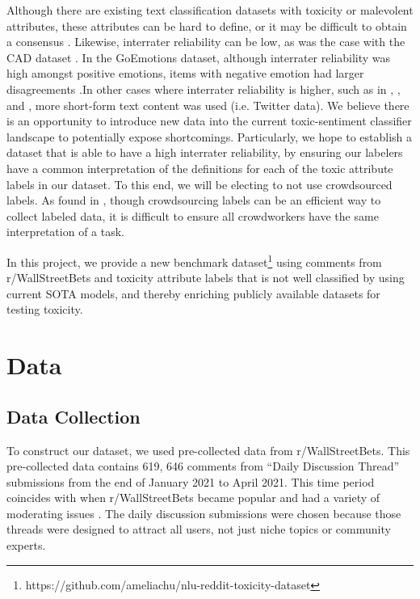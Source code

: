 \documentclass[11pt]{article}
\begin{document}
Although there are existing text classification datasets with toxicity or malevolent attributes, these attributes can be hard to define, or it may be difficult to obtain a consensus \citep{davidson2017, salminen2018, salminen2019}. Likewise, interrater reliability can be low, as was the case with the CAD dataset \citep{vidgen2021}. In the GoEmotions dataset, although interrater reliability was high amongst positive emotions, items with negative emotion had larger disagreements \citep{demszky2020}.In other cases where interrater reliability is higher, such as in \citet{pavlick2019},  \citet{salminen2020}, and \citet{zhang2021}, more short-form text content was used (i.e. Twitter data). We believe there is an opportunity to introduce new data into the current toxic-sentiment classifier landscape to potentially expose shortcomings. Particularly, we hope to establish a dataset that is able to have a high interrater reliability, by ensuring our labelers have a common interpretation of the definitions for each of the toxic attribute labels in our dataset. To this end, we will be electing to not use crowdsourced labels. As found in \citet{vidgen2020}, though crowdsourcing labels can be an efficient way to collect labeled data, it is difficult to ensure all crowdworkers have the same interpretation of a task. 

In this project, we provide a new benchmark dataset\footnote{https://github.com/ameliachu/nlu-reddit-toxicity-dataset} using comments from r/WallStreetBets and toxicity attribute labels that is not well classified by using current SOTA models, and thereby enriching publicly available datasets for testing toxicity.



\section{Data}
\subsection{Data Collection}
To construct our dataset, we used pre-collected data from r/WallStreetBets. This pre-collected data contains 619, 646 comments from ``Daily Discussion Thread'' submissions from the end of January 2021 to April 2021. This time period coincides with when  r/WallStreetBets became popular and had a variety of moderating issues \citep{mcenery2021}. The daily discussion submissions were chosen because those threads were designed to attract all users, not just niche topics or community experts. 
\end{document}

